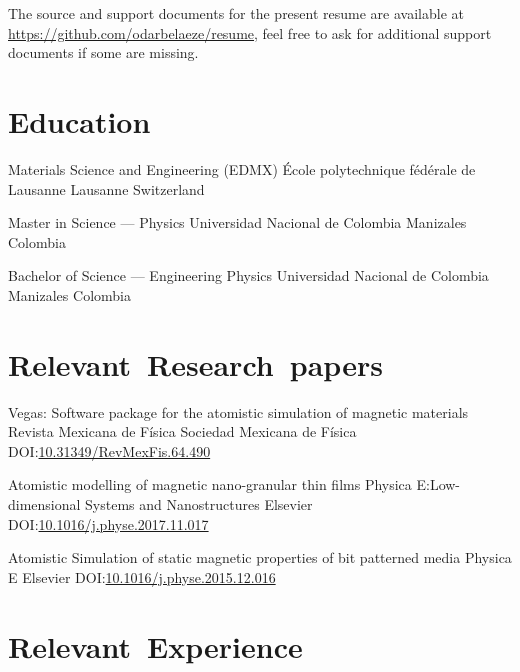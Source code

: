 \documentclass[12pt,english,letter,sans]{moderncv}
\begin{document}
\maketitle

\begin{centering}
    The source and support documents for the present resume are available at
    \url{https://github.com/odarbelaeze/resume}, feel free to ask for
    additional support documents if some are missing.
\end{centering}


\section{Education}

        {Materials Science and Engineering (EDMX)}
        {École polytechnique fédérale de Lausanne}
        {Lausanne}
        {Switzerland}
        {}

        {Master in Science --- Physics}
        {Universidad Nacional de Colombia}
        {Manizales}
        {Colombia}
        {}

        {Bachelor of Science --- Engineering Physics}
        {Universidad Nacional de Colombia}
        {Manizales}
        {Colombia}
        {}


\section{Relevant~Research~papers}

        {Vegas: Software package for the atomistic simulation of magnetic materials}
        {Revista Mexicana de Física}
        {Sociedad Mexicana de Física}
        {DOI:\@ \href{https://doi.org/10.31349/RevMexFis.64.490}{10.31349/RevMexFis.64.490}}
        {}

        {Atomistic modelling of magnetic nano-granular thin films}
        {Physica E:\@ Low-dimensional Systems and Nanostructures}
        {Elsevier}
        {DOI:\@ \href{https://doi.org/10.1016/j.physe.2017.11.017}{10.1016/j.physe.2017.11.017}}
        {}

        {Atomistic Simulation of static magnetic properties of bit patterned media}
        {Physica E}
        {Elsevier}
        {DOI:\@ \href{https://doi.org/10.1016/j.physe.2015.12.016}{10.1016/j.physe.2015.12.016}}
        {}


\section{Relevant~Experience}
\end{document}
